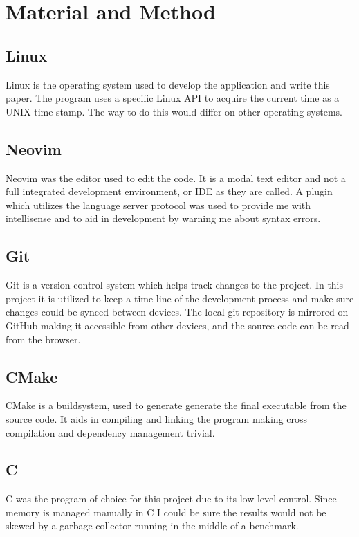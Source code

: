 \documentclass[a4paper, 12pt]{article}
\begin{document}
\section{Material and Method}

\subsection{Linux}
Linux is the operating system used to develop the application and write this
paper. The program uses a specific Linux API to acquire the current time as a
UNIX time stamp. The way to do this would differ on other operating systems.

\subsection{Neovim}
Neovim was the editor used to edit the code. It is a modal text editor and not a
full integrated development environment, or IDE as they are called. A plugin
which utilizes the language server protocol was used to provide me with
intellisense and to aid in development by warning me about syntax errors.

\subsection{Git}
Git is a version control system which helps track changes to the project. In
this project it is utilized to keep a time line of the development process and
make sure changes could be synced between devices. The local git repository is
mirrored on GitHub making it accessible from other devices, and the source code
can be read from the browser.

\subsection{CMake}
CMake is a buildsystem, used to generate generate the final executable from the
source code. It aids in compiling and linking the program making cross
compilation and dependency management trivial.

\subsection{C}
C was the program of choice for this project due to its low level control.
Since memory is managed manually in C I could be sure the results would not be
skewed by a garbage collector running in the middle of a benchmark.
\end{document}
